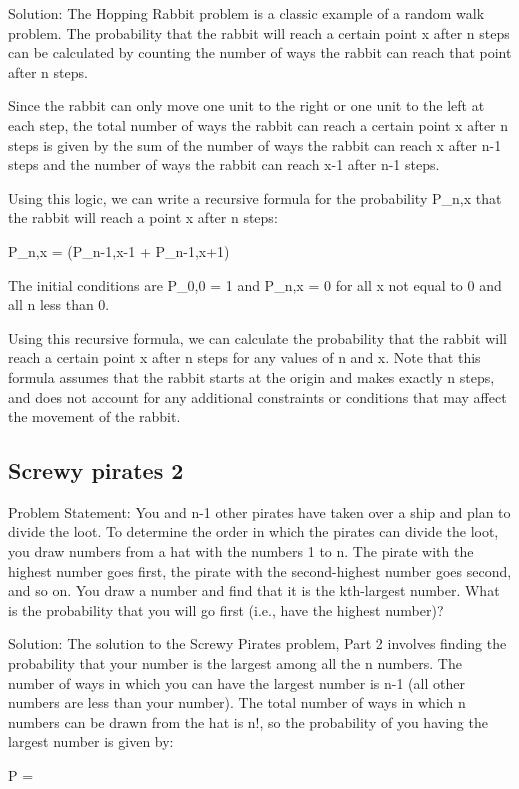 \documentclass[12pt, a4paper, oneside]{article}
\begin{document}
Solution:
The Hopping Rabbit problem is a classic example of a random walk problem. The probability that the rabbit will reach a certain point x after n steps can be calculated by counting the number of ways the rabbit can reach that point after n steps.

Since the rabbit can only move one unit to the right or one unit to the left at each step, the total number of ways the rabbit can reach a certain point x after n steps is given by the sum of the number of ways the rabbit can reach x after n-1 steps and the number of ways the rabbit can reach x-1 after n-1 steps.

Using this logic, we can write a recursive formula for the probability P_{n,x} that the rabbit will reach a point x after n steps:

P_{n,x} = (P_{n-1,x-1} + P_{n-1,x+1})

The initial conditions are P_{0,0} = 1 and P_{n,x} = 0 for all x not equal to 0 and all n less than 0.

Using this recursive formula, we can calculate the probability that the rabbit will reach a certain point x after n steps for any values of n and x. Note that this formula assumes that the rabbit starts at the origin and makes exactly n steps, and does not account for any additional constraints or conditions that may affect the movement of the rabbit.
\subsection{ Screwy pirates 2 }
Problem Statement:
You and n-1 other pirates have taken over a ship and plan to divide the loot. To determine the order in which the pirates can divide the loot, you draw numbers from a hat with the numbers 1 to n. The pirate with the highest number goes first, the pirate with the second-highest number goes second, and so on. You draw a number and find that it is the kth-largest number. What is the probability that you will go first (i.e., have the highest number)?

Solution:
The solution to the Screwy Pirates problem, Part 2 involves finding the probability that your number is the largest among all the n numbers. The number of ways in which you can have the largest number is n-1 (all other numbers are less than your number). The total number of ways in which n numbers can be drawn from the hat is n!, so the probability of you having the largest number is given by:

P = 
\end{document}
